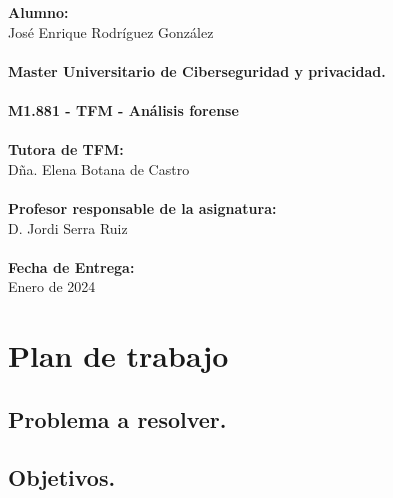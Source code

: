 \documentclass[12pt,a4paper]{report}
\begin{document}
\begin{titlepage}
\begin{minipage}{0.5\textwidth}
    \end{minipage}
    \begin{minipage}{0.5\textwidth}
        \textbf{Alumno:} \\
        {José Enrique Rodríguez González} \\
        \\
        \textbf{Master Universitario de Ciberseguridad y privacidad.} \\
        \\
        \textbf{M1.881 - TFM - Análisis forense} \\
        \\
        \textbf{Tutora de TFM:} \\
        {Dña. Elena Botana de Castro} \\
        \\
        \textbf{Profesor responsable de la asignatura:} \\
        {D. Jordi Serra Ruiz} \\
        \\
        \textbf{Fecha de Entrega:} \\
        {Enero de 2024}
    \end{minipage}
    
    \vfill %
    
    
\end{titlepage}
\restoregeometry 





\tableofcontents %

\newpage
{} 

\chapter{Plan de trabajo}

\section{Problema a resolver.}
 

\section{Objetivos.}
 
\end{document}
